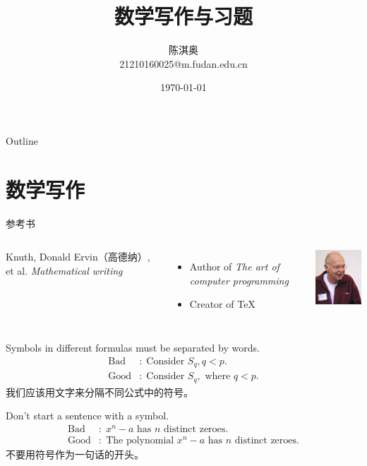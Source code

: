 \documentclass[presentation]{beamer}
\author{陈淇奥\\21210160025@m.fudan.edu.cn}
\date{\today}
\title{数学写作与习题}
\begin{document}
\maketitle
\begin{frame}{Outline}
\tableofcontents
\end{frame}




\section{数学写作}
\label{sec:org021d36b}
\begin{frame}[label={sec:org939e175}]{参考书}
\begin{columns}[onlytextwidth,T]
  \column{\dimexpr\linewidth-30mm-5mm}
\vspace{0.4cm}
Knuth, Donald Ervin（高德纳）, et al. \textit{Mathematical writing}
\vspace{0.2cm}
\begin{itemize}
\item Author of \textit{The art of computer programming}
\item Creator of \TeX
\end{itemize}

  \column{30mm}
\includegraphics[width=30mm]{2.jpg}

\end{columns}
\end{frame}
\begin{frame}[label={sec:org2971b99}]{1}
Symbols in different formulas must be separated by words.
\begin{align*}
\text{Bad}&:\;\text{Consider }S_q,q<p.\\
\text{Good}&:\;\text{Consider } S_q, \text{ where }q<p.
\end{align*}
\vspace{5mm} 我们应该用文字来分隔不同公式中的符号。
\end{frame}
\begin{frame}[label={sec:org0ef343a}]{2}
Don't start a sentence with a symbol.
\begin{align*}
    \text{Bad}&:\;x^n-a\text{ has }n\text{ distinct zeroes}.\\
    \text{Good}&:\;\text{The polynomial }x^n-a\text{ has }n\text{ distinct zeroes}.
    \end{align*}
\vspace{5mm} 不要用符号作为一句话的开头。
\end{frame}
\end{document}
